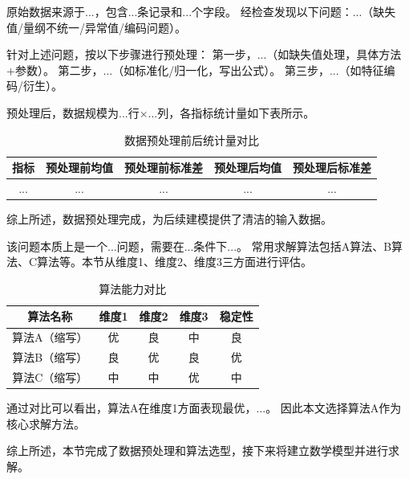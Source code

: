 原始数据来源于...，包含...条记录和...个字段。
经检查发现以下问题：...（缺失值/量纲不统一/异常值/编码问题）。

针对上述问题，按以下步骤进行预处理：
第一步，...（如缺失值处理，具体方法+参数）。
第二步，...（如标准化/归一化，写出公式）。
第三步，...（如特征编码/衍生）。

预处理后，数据规模为...行×...列，各指标统计量如下表所示。

\begin{table}[H]
  \centering
  \caption{数据预处理前后统计量对比}
  \begin{tabularx}{\textwidth}{CCCCC}
    \toprule
    指标 & 预处理前均值 & 预处理前标准差 & 预处理后均值 & 预处理后标准差 \\
    \midrule
    ... & ... & ... & ... & ... \\
    \bottomrule
  \end{tabularx}
  \label{tab:预处理对比}
\end{table}

综上所述，数据预处理完成，为后续建模提供了清洁的输入数据。

该问题本质上是一个...问题，需要在...条件下...。
常用求解算法包括A算法、B算法、C算法等。本节从维度1、维度2、维度3三方面进行评估。

\begin{table}[H]
  \centering
  \caption{算法能力对比}
  \begin{tabularx}{\textwidth}{CCCCC}
    \toprule
    算法名称 & 维度1 & 维度2 & 维度3 & 稳定性 \\
    \midrule
    算法A（缩写） & 优 & 良 & 中 & 良 \\
    算法B（缩写） & 良 & 优 & 良 & 优 \\
    算法C（缩写） & 中 & 中 & 优 & 中 \\
    \bottomrule
  \end{tabularx}
  \label{tab:算法对比1}
\end{table}

通过对比可以看出，算法A在维度1方面表现最优，...。
因此本文选择算法A作为核心求解方法。

综上所述，本节完成了数据预处理和算法选型，接下来将建立数学模型并进行求解。
